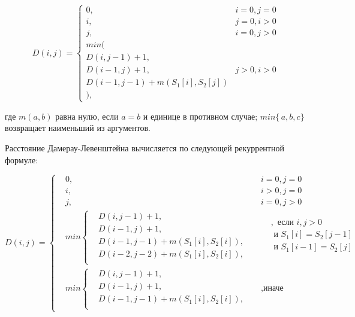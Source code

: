 \documentclass[12pt]{report}
\begin{document}
\begin{displaymath}
D(i,j) = \left\{ \begin{array}{ll}
 0, & \textrm{$i = 0, j = 0$}\\
 i, & \textrm{$j = 0, i > 0$}\\
 j, & \textrm{$i = 0, j > 0$}\\
min(\\
D(i,j-1)+1,\\
D(i-1, j) +1, &\textrm{$j>0, i>0$}\\
D(i-1, j-1) + m(S_{1}[i], S_{2}[j])\\
),
  \end{array} \right.
\end{displaymath}

где $m(a,b)$ равна нулю, если $a=b$ и единице в противном случае; $min\{\,a,b,c\}$ возвращает наименьший из аргументов.

Расстояние Дамерау-Левенштейна вычисляется по следующей рекуррентной формуле:
		    
		     \[ D(i, j) =  \left\{
			\begin{aligned}
				&0, && i = 0, j = 0\\
		    	&i, && i > 0, j = 0\\
		    	&j, && i = 0, j > 0\\		    	
		    	&min \left\{
				\begin{aligned}
					&D(i, j - 1) + 1,\\
		            &D(i - 1, j) + 1,\\
		            &D(i - 1, j - 1) + m(S_{1}[i], S_{2}[i]), \\
		            &D(i - 2, j - 2) + m(S_{1}[i], S_{2}[i]),\\
		        \end{aligned} \right.
		        && 
				\begin{aligned}
					&, \text{ если } i, j > 0 \\
		            & \text{ и } S_{1}[i] = S_{2}[j - 1] \\
		            & \text{ и } S_{1}[i - 1] =  S_{2}[j] \\
		        \end{aligned} \\ 
		        &min \left\{
		        \begin{aligned}
		            &D(i, j - 1) + 1,\\
		            &D(i - 1, j) + 1, \\
		            &D(i - 1, j - 1) + m(S_{1}[i], S_{2}[i]),\\
		        \end{aligned} \right.  &&, \text{иначе}
			\end{aligned} \right.
			\]	
	    
\end{document}
